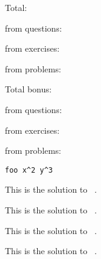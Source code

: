 \documentclass{article}
\newcommand*\writehere{%
      \IfInsideSolutionTF{}{%
        \tcblower
        \emph{Your answer:}
        \vspace*{4cm}
      }%
    }
\begin{document}
Total: \printtotalpoints \par
from questions:  \par
from exercises:  \par
from problems:  \par \bigskip

Total bonus: \printtotalbonus \par
from questions:  \par
from exercises:  \par
from problems:  \par

\begin{question}[points=4,bonus-points=1,topic=geometry,tags={geometry,triangles},grade=7]
  \lipsum[1]
\begin{verbatim}
foo x^2 y^3
\end{verbatim}
\end{question}
\begin{solution}[print]
  This is the solution to \ExerciseType\ .
\end{solution}


\begin{question}[subtitle=Foo,points=5,topic=analysis,tags={analysis,functions},grade=11]
  \lipsum[2]
\end{question}
\begin{solution}
  This is the solution to \ExerciseType\ .
\end{solution}


\begin{problem}[tags={analysis,functions}]
  \lipsum[3]
  \writehere
\end{problem}
\begin{answer}
  This is the solution to \ExerciseType\ .
\end{answer}


\begin{exercise}
  \lipsum[4]
\end{exercise}
\begin{hint}
  This is the solution to \ExerciseType\ .
\end{hint}
\end{document}
